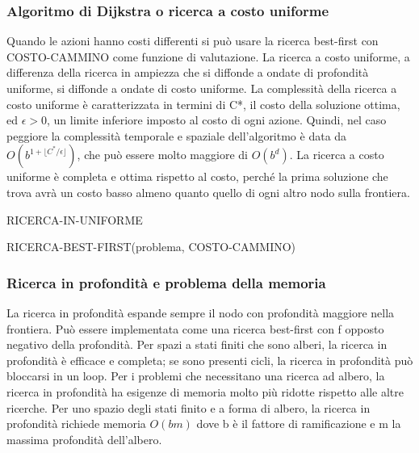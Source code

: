 \documentclass{article}
\begin{document}
\subsubsection{Algoritmo di Dijkstra o ricerca a costo uniforme}
Quando le azioni hanno costi differenti si può usare la ricerca best-first con COSTO-CAMMINO come funzione di valutazione. La ricerca a costo uniforme, a differenza della ricerca in ampiezza che si diffonde a ondate di profondità uniforme, si diffonde a ondate di costo uniforme. La complessità della ricerca a costo uniforme è caratterizzata in termini di C*, il costo della soluzione ottima, ed $\epsilon >0$, un limite inferiore imposto al costo di ogni azione. Quindi, nel caso peggiore la complessità temporale e spaziale dell'algoritmo è data da $O(b^{1+\lfloor C^*/\epsilon \rfloor})$, che può essere molto maggiore di $O(b^d)$.\newline
La ricerca a costo uniforme è completa e ottima rispetto al costo, perché la prima soluzione che trova avrà un costo basso almeno quanto quello di ogni altro nodo sulla frontiera.
\begin{center}
\begin{algorithm}
\caption{RICERCA-IN-UNIFORME}
\Return RICERCA-BEST-FIRST(problema, COSTO-CAMMINO)\;
\end{algorithm}
\end{center}
\newpage
\subsubsection{Ricerca in profondità e problema della memoria}
La ricerca in profondità espande sempre il nodo con profondità maggiore nella frontiera. Può essere implementata come una ricerca best-first con f opposto negativo della profondità.
Per spazi a stati finiti che sono alberi, la ricerca in profondità è efficace e completa; se sono presenti cicli, la ricerca in profondità può bloccarsi in un loop. Per i problemi che necessitano una ricerca ad albero, la ricerca in profondità ha esigenze di memoria molto più ridotte rispetto alle altre ricerche.
Per uno spazio degli stati finito e a forma di albero, la ricerca in profondità richiede memoria $O(bm)$ dove b è il fattore di ramificazione e m la massima profondità dell'albero.
\end{document}
